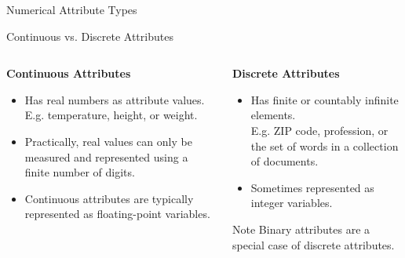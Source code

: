 \begin{frame}{Numerical Attribute Types}
\end{frame}

\begin{frame}[c]{Continuous vs. Discrete Attributes}
	\begin{columns}[t]
		\begin{column}{0.5\columnwidth}
			\centering \textbf{Continuous Attributes}
			\begin{itemize}
				\item Has real numbers as attribute values.\\
				      E.g. temperature, height, or weight.
				\item Practically, real values can only be measured and represented using a finite number of digits.
				\item Continuous attributes are typically represented as floating-point variables.
			\end{itemize}
		\end{column}
		\begin{column}{0.5\columnwidth}
			\centering \textbf{Discrete Attributes}
			\begin{itemize}
				\item Has finite or countably infinite elements.\\
				      E.g. ZIP code, profession, or the set of words in a collection of documents.
				\item Sometimes represented as integer variables.
			\end{itemize}
			\begin{alertblock}{Note}
				Binary attributes are a special case of discrete attributes.
			\end{alertblock}
		\end{column}
	\end{columns}
\end{frame}
